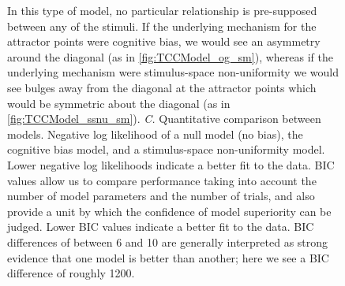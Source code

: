 {\begin{figure}
{    In this type of model, no particular relationship is pre-supposed between any of the stimuli. 
    If the underlying mechanism for the attractor points were cognitive bias, we would see an asymmetry around the diagonal (as in \autoref{fig:TCCModel_og_sm}), whereas if the underlying mechanism were stimulus-space non-uniformity we would see bulges away from the diagonal at the attractor points which would be symmetric about the diagonal (as in \autoref{fig:TCCModel_ssnu_sm}).
    \emph{C.} Quantitative comparison between models. Negative log likelihood of a null model (no bias), the cognitive bias model, and a stimulus-space non-uniformity model. Lower negative log likelihoods indicate a better fit to the data. BIC values allow us to compare performance taking into account the number of model parameters and the number of trials, and also provide a unit by which the confidence of model superiority can be judged. Lower BIC values indicate a better fit to the data. BIC differences of between 6 and 10 are generally interpreted as strong evidence that one model is better than another; here we see a BIC difference of roughly 1200.
    } 
    \label{fig:TCCOutput}
\end{figure}

}
